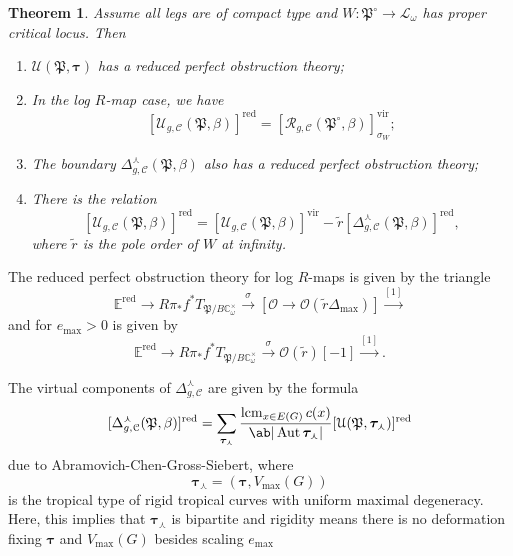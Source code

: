 \documentclass[10pt]{amsart}
\newtheorem{thm}{Theorem}[section]
\theoremstyle{definition}
\theoremstyle{remark}
\theoremstyle{plain}
\theoremstyle{definition}
\theoremstyle{remark}
\newcommand{\C}{\mathbb{C}}
\newcommand{\E}{\mathbb{E}}
\newcommand{\mc}[1]{\mathcal{#1}}
\newcommand{\mf}[1]{\mathfrak{#1}}
\newcommand{\btau}{\bm{\tau}}
\newcommand{\mr}[1]{\mathrm{#1}}
\newcommand{\on}[1]{\operatorname{#1}}
\newcommand{\1}{\mathbf{1}}
\newcommand{\2}{\mathbf{2}}
\newcommand{\3}{\mathbf{3}}
\newcommand{\vir}{\mr{vir}}
\DeclareMathOperator{\Aut}{Aut}
\begin{document}
\begin{thm}
    Assume all legs are of compact type and $W \colon \mf{P}^{\circ} \to \mc{L}_{\omega}$ has proper critical locus. Then
    \begin{enumerate}
        \item $\mc{U}(\mf{P},\btau)$ has a reduced perfect obstruction theory;
        \item In the log $R$-map case, we have
            \[ [\mc{U}_{g, \mc{C}}(\mf{P},\beta)]^{\on{red}} = [\mc{R}_{g,\mc{C}}(\mf{P}^{\circ}, \beta)]^{\vir}_{\sigma_W}; \]
        \item The boundary $\Delta_{g, \mc{C}}^{\curlywedge}(\mf{P}, \beta)$ also has a reduced perfect obstruction theory;
        \item There is the relation
            \[ [\mc{U}_{g, \mc{C}}(\mf{P}, \beta)]^{\on{red}} = [\mc{U}_{g, \mc{C}}(\mf{P}, \beta)]^{\vir} - \tilde{r} [\Delta^{\curlywedge}_{g, \mc{C}}(\mf{P}, \beta)]^{\on{red}}, \]
            where $\tilde{r}$ is the pole order of $W$ at infinity.
    \end{enumerate}
\end{thm}

The reduced perfect obstruction theory for log $R$-maps is given by the triangle
\[ \E^{\on{red}} \to R \pi_* f^* T_{\mf{P}/B\C_{\omega}^{\times}} \xrightarrow{\sigma} [\mc{O} \to \mc{O}(\tilde{r}\Delta_{\max})] \xrightarrow{[1]} \]
and for $e_{\max} > 0$ is given by
\[ \E^{\on{red}} \to R \pi_* f^* T_{\mf{P}/B\C_{\omega}^{\times}} \xrightarrow{\sigma} \mc{O}(\tilde{r})[-1] \xrightarrow{[1]}. \]

The virtual components of $\Delta_{g,\mc{C}}^{\curlywedge}$ are given by the formula
\[ [\Delta_{g, \mc{C}}^{\curlywedge}(\mf{P}, \beta)]^{\on{red}} = \sum_{\btau_{\curlywedge}} \frac{\on{lcm}_{x\in E(G)} c(x)}{\ab|\Aut \btau_{\curlywedge}|} [\mc{U}(\mf{P}, \btau_{\curlywedge})]^{\on{red}} \]
due to Abramovich-Chen-Gross-Siebert, where
\[ \btau_{\curlywedge} = (\btau, V_{\max}(G)) \]
is the tropical type of rigid tropical curves with uniform maximal degeneracy. Here, this implies that $\btau_{\curlywedge}$ is bipartite and rigidity means there is no deformation fixing $\btau$ and $V_{\max}(G)$ besides scaling $e_{\max}$
\end{document}
